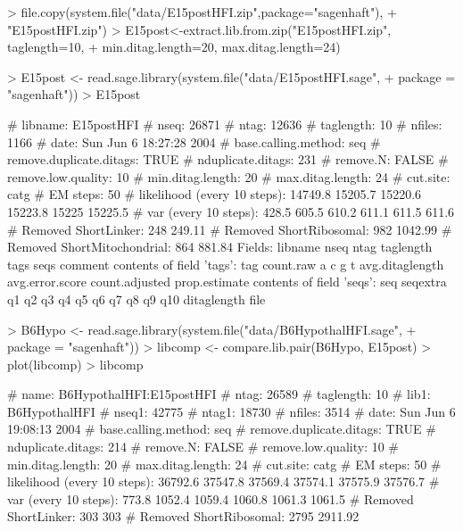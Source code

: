 \documentclass[12pt]{article}
\begin{document}
\begin{Schunk}
\begin{Sinput}
> file.copy(system.file("data/E15postHFI.zip",package="sagenhaft"),
+          "E15postHFI.zip")
> E15post<-extract.lib.from.zip("E15postHFI.zip", taglength=10,
+                               min.ditag.length=20, max.ditag.length=24)
\end{Sinput}
\end{Schunk}

\begin{Schunk}
\begin{Sinput}
> E15post <- read.sage.library(system.file("data/E15postHFI.sage", 
+     package = "sagenhaft"))
> E15post
\end{Sinput}
\begin{Soutput}
# libname: E15postHFI
# nseq: 26871
# ntag: 12636
# taglength: 10
# nfiles: 1166
# date: Sun Jun  6 18:27:28 2004
# base.calling.method: seq
# remove.duplicate.ditags: TRUE
# nduplicate.ditags: 231
# remove.N: FALSE
# remove.low.quality: 10
# min.ditag.length: 20
# max.ditag.length: 24
# cut.site: catg
# EM steps: 50
# likelihood (every 10 steps): 14749.8 15205.7 15220.6 15223.8 15225 15225.5
# var (every 10 steps): 428.5 605.5 610.2 611.1 611.5 611.6
# Removed ShortLinker: 248 249.11
# Removed ShortRibosomal: 982 1042.99
# Removed ShortMitochondrial: 864 881.84
Fields:
libname nseq ntag taglength tags seqs comment
contents of field 'tags':
tag count.raw a c g t avg.ditaglength avg.error.score count.adjusted prop.estimate
contents of field 'seqs':
seq seqextra q1 q2 q3 q4 q5 q6 q7 q8 q9 q10 ditaglength file
\end{Soutput}
\begin{Sinput}
> B6Hypo <- read.sage.library(system.file("data/B6HypothalHFI.sage", 
+     package = "sagenhaft"))
> libcomp <- compare.lib.pair(B6Hypo, E15post)
> plot(libcomp)
> libcomp
\end{Sinput}
\begin{Soutput}
# name: B6HypothalHFI:E15postHFI
# ntag: 26589
# taglength: 10
# lib1: B6HypothalHFI
# nseq1: 42775
# ntag1: 18730
# nfiles: 3514
# date: Sun Jun  6 19:08:13 2004
# base.calling.method: seq
# remove.duplicate.ditags: TRUE
# nduplicate.ditags: 214
# remove.N: FALSE
# remove.low.quality: 10
# min.ditag.length: 20
# max.ditag.length: 24
# cut.site: catg
# EM steps: 50
# likelihood (every 10 steps): 36792.6 37547.8 37569.4 37574.1 37575.9 37576.7
# var (every 10 steps): 773.8 1052.4 1059.4 1060.8 1061.3 1061.5
# Removed ShortLinker: 303 303
# Removed ShortRibosomal: 2795 2911.92

\end{Soutput}
\end{Schunk}
\end{document}
